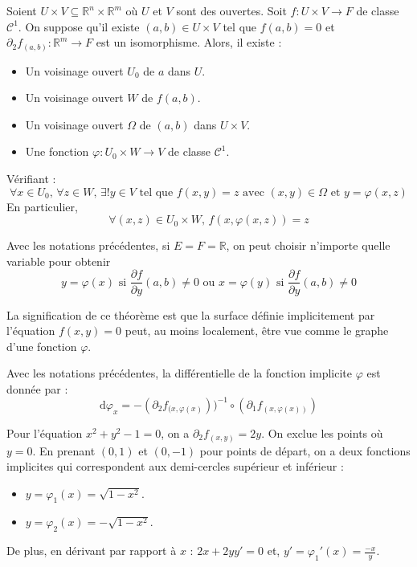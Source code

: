   \begin{theorem}
    Soient $U \times V \subseteq \mathbb{R}^n \times \mathbb{R}^m$ où $U$ et $V$ sont des ouvertes. Soit $f : U \times V \rightarrow F$ de classe $\mathcal{C}^1$. On suppose qu'il existe $(a,b) \in U \times V$ tel que $f(a,b)=0$ et $\partial_2 f_{(a,b)} : \mathbb{R}^m \rightarrow F$ est un isomorphisme. Alors, il existe :
    \begin{itemize}
      \item Un voisinage ouvert $U_0$ de $a$ dans $U$.
      \item Un voisinage ouvert $W$ de $f(a,b)$.
      \item Un voisinage ouvert $\Omega$ de $(a,b)$ dans $U \times V$.
      \item Une fonction $\varphi : U_0 \times W \rightarrow V$ de classe $\mathcal{C}^1$.
    \end{itemize}
    Vérifiant :
    \[ \forall x \in U_0, \, \forall z \in W, \, \exists! y \in V \text{ tel que } f(x,y)=z \text{ avec } (x, y) \in \Omega \text{ et } y=\varphi(x,z) \]
    En particulier,
    \[ \forall (x,z) \in U_0 \times W, \, f(x, \varphi(x,z)) = z \]
  \end{theorem}


  \begin{remark}
    Avec les notations précédentes, si $E = F = \mathbb{R}$, on peut choisir n'importe quelle variable pour obtenir
    \[ y = \varphi(x) \text{ si } \frac{\partial f}{\partial y}(a,b) \neq 0 \text{ ou } x = \varphi(y) \text{ si } \frac{\partial f}{\partial y}(a,b) \neq 0 \]
  \end{remark}


  \begin{remark}
    La signification de ce théorème est que la surface définie implicitement par l'équation $f(x,y)=0$ peut, au moins localement, être vue comme le graphe d'une fonction $\varphi$.
  \end{remark}

  \begin{proposition}
    Avec les notations précédentes, la différentielle de la fonction implicite $\varphi$ est donnée par :
    \[ \mathrm{d}\varphi_x = -(\partial_2 f_{(x, \varphi(x)}))^{-1} \circ (\partial_1 f_{(x, \varphi(x))}) \]
  \end{proposition}

  \begin{example}
    Pour l'équation $x^2 + y^2 - 1 = 0$, on a $\partial_2 f_{(x,y)} = 2y$. On exclue les points où $y = 0$. En prenant $(0,1)$ et $(0,-1)$ pour points de départ, on a deux fonctions implicites qui correspondent aux demi-cercles supérieur et inférieur :
    \begin{itemize}
      \item $y = \varphi_1(x) = \sqrt{1-x^2}$.
      \item $y = \varphi_2(x) = -\sqrt{1-x^2}$.
    \end{itemize}
    De plus, en dérivant par rapport à $x$ : $2x + 2yy' = 0$ et, $y' = \varphi_1'(x) = \frac{-x}{y}$.
  \end{example}

